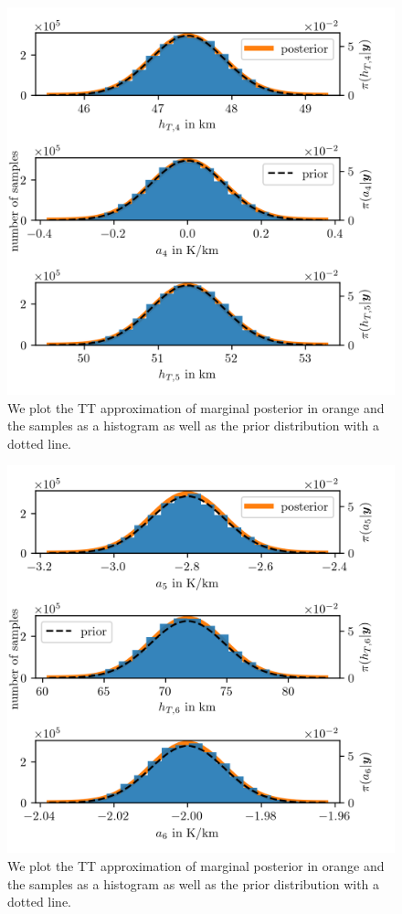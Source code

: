 \begin{figure}[ht!]
	\centering
	\includegraphics{PHdPTPost4.png}
	\caption[Histograms and TT approximation of posterior distribution as well as hyper-prior distribution.]{We plot the TT approximation of marginal posterior in orange and the samples as a histogram as well as the prior distribution with a dotted line.}
	\label{fig:PostHistTT4}
\end{figure}
\begin{figure}[ht!]
	\centering
	\includegraphics{PHdPTPost5.png}
	\caption[Histograms and TT approximation of posterior distribution as well as hyper-prior distribution.]{We plot the TT approximation of marginal posterior in orange and the samples as a histogram as well as the prior distribution with a dotted line.}
	\label{fig:PostHistTT5}
\end{figure}
